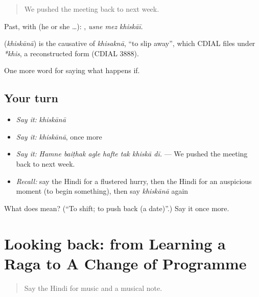 \begin{quote}
We pushed the meeting back to next week.
\end{quote}

Past, with  (he or she …):   , \emph{usne mez khiskāī}.

\begin{cousinweb}
\textbf{} (\emph{khiskānā}) is the causative of \emph{khisaknā}, \textquotedblleft{}to slip away\textquotedblright{}, which CDIAL files under \emph{*khis}, a reconstructed form (CDIAL 3888).
\end{cousinweb}

\begin{grammarlens}[title={What you've built}]
One more word for saying what happens if.
\end{grammarlens}

\subsection*{Your turn}
\begin{itemize}
\raggedright
  \item \emph{Say it:} \emph{khiskānā}
  \item \emph{Say it:} \emph{khiskānā}, once more
  \item \emph{Say it:} \emph{Hamne baiṭhak agle hafte tak khiskā dī.} — We pushed the meeting back to next week.
  \item \emph{Recall:} say the Hindi for a flustered hurry, then the Hindi for an auspicious moment (to begin something), then say \emph{khiskānā} again
\end{itemize}

\begin{tcolorbox}[breakable,colback=teal!4,colframe=teal!35!black,title={Before you move on}]
What does  mean? (\textquotedblleft{}To shift; to push back (a date)\textquotedblright{}.) Say it once more.
\end{tcolorbox}
\section[(dialogue)]{Looking back: from Learning a Raga to A Change of Programme}

\label{lesson:HI-R537-review-530-537}



\begin{quote}
Say the Hindi for music and a musical note.
\end{quote}

